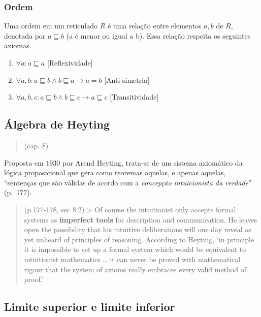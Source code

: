 \hypertarget{ordem}{%
\subsubsection{Ordem}\label{ordem}}

Uma ordem em um reticulado \(R\) é uma relação entre elementos \(a, b\)
de \(R\), denotada por \(a \sqsubseteq b\) (a é menor ou igual a b).
Essa relação respeita os seguintes axiomas.

\begin{enumerate}
\def\labelenumi{\arabic{enumi}.}
\tightlist
\item
  \(\forall a : a \sqsubseteq a\) {[}Reflexividade{]}
\item
  \(\forall a, b : a \sqsubseteq b \land b \sqsubseteq a \rightarrow a = b\)
  {[}Anti-simetria{]}
\item
  \(\forall a, b, c : a \sqsubseteq b \land b \sqsubseteq c \rightarrow a \sqsubseteq c\)
  {[}Transitividade{]}
\end{enumerate}

\hypertarget{uxe1lgebra-de-heyting}{%
\subsection{Álgebra de Heyting}\label{uxe1lgebra-de-heyting}}

\begin{quote}
(cap. 8)
\end{quote}

Proposta em \(1930\) por Arend Heyting, trata-se de um sistema
axiomático da lógica proposicional que gera como teoremas aquelas, e
apenas aquelas, ``sentenças que são válidas de acordo com a
\emph{concepção intuicionista da verdade}'' (p.~\(177\)).

\begin{quote}
(p.177-178, sec 8.2) \textgreater{} Of course the intuitionist only
accepts formal systems as \textbf{imperfect tools} for description and
communication. He leaves open the possibility that his intuitive
deliberations will one day reveal as yet unheard of principles of
reasoning. According to Heyting, `in principle it is impossible to set
up a formal system which would be equivalent to intuitionist mathematics
\ldots{} it can never be proved with mathematical rigour that the system
of axioms really embraces every valid method of proof.'
\end{quote}

\hypertarget{limite-superior-e-limite-inferior}{%
\subsection{Limite superior e limite
inferior}\label{limite-superior-e-limite-inferior}}

